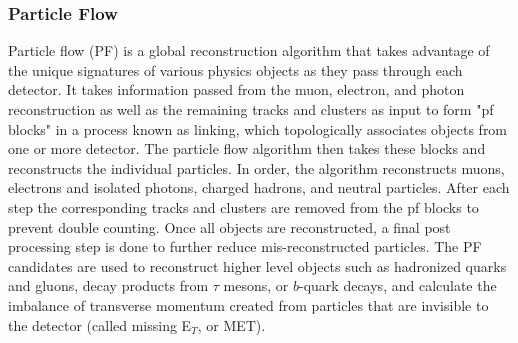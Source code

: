 \subsubsection{Particle Flow} \label{sec:CMS_PF}
Particle flow (PF) is a global reconstruction algorithm that takes advantage of the unique signatures of various physics objects as they pass through each detector. It takes information passed from the muon, electron, and photon reconstruction as well as the remaining tracks and clusters as input to form "pf blocks" in a process known as linking, which topologically associates objects from one or more detector. The particle flow algorithm then takes these blocks and reconstructs the individual particles. In order, the algorithm reconstructs muons, electrons and isolated photons, charged hadrons, and neutral particles. After each step the corresponding tracks and clusters are removed from the pf blocks to prevent double counting. Once all objects are reconstructed, a final post processing step is done to further reduce mis-reconstructed particles. The PF candidates are used to reconstruct higher level objects such as hadronized quarks and gluons, decay products from $\tau$ mesons, or $b$-quark decays, and calculate the imbalance of transverse momentum created from particles that are invisible to the detector (called missing E$_T$, or MET).